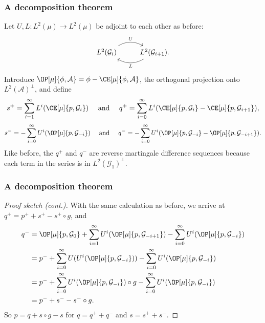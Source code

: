 \documentclass[shortlabels, 9pt, aspectratio=2013]{beamer}
\begin{document}
\begin{frame}[fragile]
  \frametitle{A decomposition theorem}
  \begin{proofs}
    Let \(U,L \colon L^2(\mu) \to L^2(\mu)\) be adjoint to each other as before:
    \[
      \begin{tikzcd}
        {L^2(\mathcal{G}_i)} & {L^2(\mathcal{G}_{i+1})}
        \arrow["U", bend left, from=1-1, to=1-2]
        \arrow["L", bend left, from=1-2, to=1-1].
      \end{tikzcd}
    \]
    Introduce \(\OP[\mu]{\phi,\mathcal{A}} = \phi - \CE[\mu]{\phi,\mathcal{A}}\), the orthogonal projection onto \(L^2(\mathcal{A})^{\bot}\), and define
    \begin{equation*}
      s^+ = \sum_{i = 1}^{\infty} L^i(\CE[\mu]{p,\mathcal{G}_i})\quad\text{ and }\quad
      q^+ = \sum_{i = 0}^{\infty} L^i(\CE[\mu]{p,\mathcal{G}_i} - \CE[\mu]{p, \mathcal{G}_{i + 1}}),
    \end{equation*}
    \begin{equation*}
      s^- = - \sum_{i = 0}^{\infty} U^i(\OP[\mu]{p,\mathcal{G}_{-i}})\quad\text{ and }\quad
      q^- = - \sum_{i = 0}^{\infty} U^i(\OP[\mu]{p, \mathcal{G}_{-i}} - \OP[\mu]{p,\mathcal{G}_{-i + 1}}).
    \end{equation*}
    Like before, the \(q^+\) and \(q^-\) are reverse martingale difference sequences because each term in the series is in \(L^2(\mathcal{G}_1)^{\bot}\).
  \end{proofs}
\end{frame}
\begin{frame}[fragile]
  \frametitle{A decomposition theorem}
  \begin{proof}[Proof sketch (cont.)]
    With the same calculation as before, we arrive at \(q^+ = p^+ + s^+ - s^+ \circ g\), and
    \begin{align*}
      q^- &=
            \OP[\mu]{p,\mathcal{G}_0} + 
            \sum_{i = 1}^{\infty} U^i(\OP[\mu]{p,\mathcal{G}_{-i + 1}}) - 
            \sum_{i = 0}^{\infty} U^i(\OP[\mu]{p, \mathcal{G}_{-i}})\\
          &=
            p^- +
            \sum_{i = 0}^{\infty} U(U^i(\OP[\mu]{p,\mathcal{G}_{-i}})) - 
            \sum_{i = 0}^{\infty} U^i(\OP[\mu]{p, \mathcal{G}_{-i}})\\
          &=
            p^- +
            \sum_{i = 0}^{\infty} U^i(\OP[\mu]{p,\mathcal{G}_{-i}}) \circ g - 
            \sum_{i = 0}^{\infty} U^i(\OP[\mu]{p, \mathcal{G}_{-i}})\\
          &=
            p^- + s^- - s^- \circ g.
    \end{align*}
    So \(p = q + s \circ g - s\) for \(q = q^+ + q^-\) and \(s = s^+ + s^-\).
  \end{proof}
\end{frame}
\end{document}
